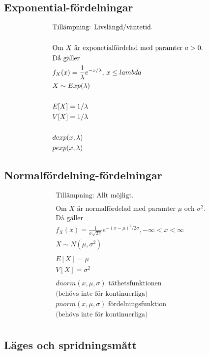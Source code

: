 \begin{multicols}{2}
\subsection{Exponential-fördelningar}
\begin{align*}
  &\text{Tillämpning: Livslängd/väntetid.} \\
  &\\
  &\text{Om $X$ är exponetialfördelad med paramter $ a > 0 $.} \\
  &\text{Då gäller} \\
  &f_X(x) = \frac{1}{\lambda} e^{-x/\lambda}, \, x\leq{lambda} \\
  &X \sim Exp(\lambda) \\
  &\\
  &E[X]= 1/\lambda \\
  &V[X]= 1/\lambda \\
  &\\
  &dexp(x, \lambda) \\
  &pexp(x, \lambda) \\
\end{align*}

\subsection{Normalfördelning-fördelningar}
\begin{align*}
  &\text{Tillämpning: Allt möjligt.} \\
  &\\
  &\text{Om $X$ är normalfördelad med paramter $\mu$ och $\sigma^2$.} \\
  &\text{Då gäller} \\
  &f_X(x) = \frac{1}{\sigma\sqrt{2\pi}} e^{-(x-\mu)^2/2\sigma}, -\infty<x<\infty \\
  &X \sim N(\mu,\sigma^2) \\
  &\\
  &E[X]= \mu \\
  &V[X]= \sigma^2 \\
  &\\
  &dnorm(x, \mu, \sigma) \text{ täthetsfunktionen} \\
  &\text{(behövs inte för kontinuerliga)} \\
  &pnorm(x, \mu, \sigma) \text{ fördelningsfunktion} \\
  &\text{(behövs inte för kontinuerliga)} \\
\end{align*}


\subsection{Läges och spridningsmått}

\end{multicols}
